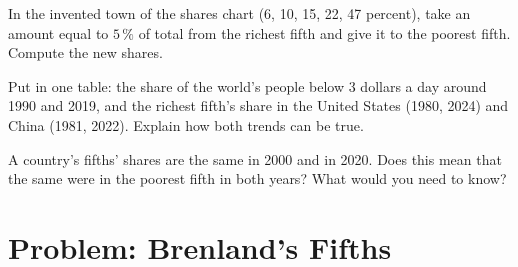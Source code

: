 \begin{exercise}[$\star\star\star$]\label{exo:g9:income-distribution:10}
In the invented town of the shares chart (6, 10, 15, 22, 47 percent),  take an amount equal to $5\,\%$ of
total  from the richest fifth and give it to the poorest fifth. Compute the new shares.
\end{exercise}

\begin{exercise}[$\star\star\star$]\label{exo:g9:income-distribution:11}
Put in one table: the share of the world's people below 3 dollars a day around 1990 and 2019, and the richest
fifth's share in the United States (1980, 2024) and China (1981, 2022). Explain how both trends can be true.
\end{exercise}

\begin{exercise}[$\star\star\star$]\label{exo:g9:income-distribution:12}
A country's fifths' shares are the same in 2000 and in 2020. Does this mean that the same  were
in the poorest fifth in both years? What would you need to know?
\end{exercise}

\section{Problem: Brenland's Fifths}

